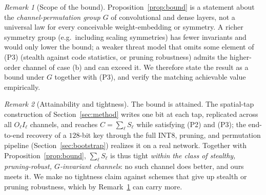 \documentclass[10pt,journal]{IEEEtran}
\theoremstyle{remark}
\newtheorem{remark}{Remark}
\begin{document}
\begin{remark}[Scope of the bound]\label{rem:scope}
Proposition~\ref{prop:bound} is a statement about the \emph{channel-permutation group $G$} of
convolutional and dense layers, not a universal law for every conceivable weight-embedding or
symmetry. A richer symmetry group (e.g.\ including scaling symmetries) has fewer invariants and
would only lower the bound; a weaker threat model that omits some element of \textup{(P3)}
(stealth against code statistics, or pruning robustness) admits the higher-order channel of
case (b) and can exceed it. We therefore state the result as a bound under $G$ together with
\textup{(P3)}, and verify the matching achievable value empirically.
\end{remark}

\begin{remark}[Attainability and tightness]\label{rem:tight}
The bound is attained. The spatial-tap construction of Section~\ref{sec:method} writes one
bit at each tap, replicated across all $O_\ell I_\ell$ channels, and reaches
$C=\sum_\ell S_\ell$ while satisfying \textup{(P2)} and \textup{(P3)}; the end-to-end
recovery of a $128$-bit key through the full INT8, pruning, and permutation pipeline
(Section~\ref{sec:bootstrap}) realizes it on a real network. Together with
Proposition~\ref{prop:bound}, $\sum_\ell S_\ell$ is thus tight \emph{within the class of
stealthy, pruning-robust, $G$-invariant channels}: no such channel does better, and ours
meets it. We make no tightness claim against schemes that give up stealth or pruning
robustness, which by Remark~\ref{rem:scope} can carry more.
\end{remark}
\end{document}
